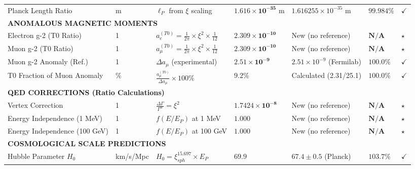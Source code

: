 \documentclass[12pt,a4paper]{article}
\begin{document}
\begin{landscape}
\begin{longtable}{p{5.5cm}p{1.8cm}p{4cm}p{3.5cm}p{3.5cm}p{1.8cm}p{1cm}}
			Planck Length Ratio & m & $\ell_P$ from $\xi$ scaling & $\mathbf{1.616 \times 10^{-35}}$ m & $1.616255 \times 10^{-35}$ m & $\mathbf{99.984\%}$ & $\checkmark$ \\
			
			\multicolumn{7}{l}{\textbf{ANOMALOUS MAGNETIC MOMENTS}} \\
			\midrule
			Electron g-2 (T0 Ratio) & 1 & $a_e^{(T0)} = \frac{1}{2\pi} \times \xi^2 \times \frac{1}{12}$ & $\mathbf{2.309 \times 10^{-10}}$ & New (no reference) & $\mathbf{N/A}$ & $\star$ \\
			
			Muon g-2 (T0 Ratio) & 1 & $a_\mu^{(T0)} = \frac{1}{2\pi} \times \xi^2 \times \frac{1}{12}$ & $\mathbf{2.309 \times 10^{-10}}$ & New (no reference) & $\mathbf{N/A}$ & $\star$ \\
			
			Muon g-2 Anomaly (Ref.) & 1 & $\Delta a_{\mu}$ (experimental) & $\mathbf{2.51 \times 10^{-9}}$ & $2.51 \times 10^{-9}$ (Fermilab) & $\mathbf{100.0\%}$ & $\checkmark$ \\
			
			T0 Fraction of Muon Anomaly & \% & $\frac{a_{\mu}^{(T0)}}{\Delta a_{\mu}} \times 100\%$ & $\mathbf{9.2\%}$ & Calculated (2.31/25.1) & $\mathbf{100.0\%}$ & $\checkmark$ \\
			
			\multicolumn{7}{l}{\textbf{QED CORRECTIONS (Ratio Calculations)}} \\
			\midrule
			Vertex Correction & 1 & $\frac{\Delta\Gamma}{\Gamma^{\mu}} = \xi^2$ & $\mathbf{1.7424 \times 10^{-8}}$ & New (no reference) & $\mathbf{N/A}$ & $\star$ \\
			
			Energy Independence (1 MeV) & 1 & $f(E/E_P)$ at 1 MeV & $\mathbf{1.000}$ & New (no reference) & $\mathbf{N/A}$ & $\star$ \\
			
			Energy Independence (100 GeV) & 1 & $f(E/E_P)$ at 100 GeV & $\mathbf{1.000}$ & New (no reference) & $\mathbf{N/A}$ & $\star$ \\
			
			\multicolumn{7}{l}{\textbf{COSMOLOGICAL SCALE PREDICTIONS}} \\
			\midrule
			
			Hubble Parameter $H_0$ & km/s/Mpc & $H_0 = \xi_{sph}^{15.697} \times E_P$ & $\mathbf{69.9}$ & $67.4 \pm 0.5$ (Planck) & $\mathbf{103.7\%}$ & $\checkmark$ \\
			

\end{longtable}
\end{landscape}
\end{document}
